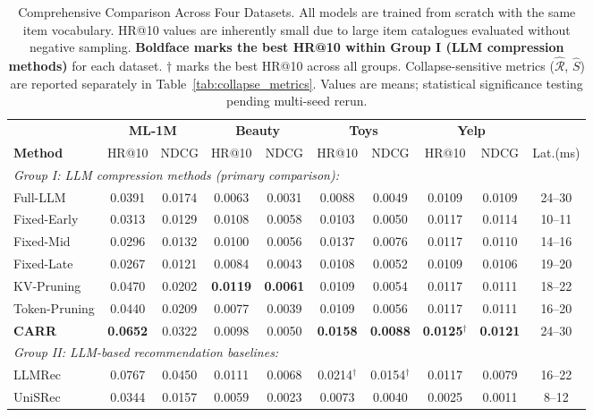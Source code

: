 \documentclass[lettersize,journal]{IEEEtran}
\begin{document}
\begin{table}[!t]
\caption{Comprehensive Comparison Across Four Datasets. All models are trained from scratch with the same item vocabulary. HR@10 values are inherently small due to large item catalogues evaluated without negative sampling. \textbf{Boldface marks the best HR@10 within Group I (LLM compression methods)} for each dataset. $\dagger$ marks the best HR@10 across all groups. Collapse-sensitive metrics ($\widehat{\mathcal{R}}$, $\widehat{S}$) are reported separately in Table~\ref{tab:collapse_metrics}. Values are means; statistical significance testing pending multi-seed rerun.\label{tab:main}}
\centering
\begin{tabular}{l|cc|cc|cc|cc|c}
\toprule
& \multicolumn{2}{c|}{\textbf{ML-1M}} & \multicolumn{2}{c|}{\textbf{Beauty}} & \multicolumn{2}{c|}{\textbf{Toys}} & \multicolumn{2}{c|}{\textbf{Yelp}} & \\
\textbf{Method} & HR@10 & NDCG & HR@10 & NDCG & HR@10 & NDCG & HR@10 & NDCG & Lat.(ms) \\
\midrule
\multicolumn{10}{l}{\textit{Group I: LLM compression methods (primary comparison):}} \\
\midrule
Full-LLM & 0.0391 & 0.0174 & 0.0063 & 0.0031 & 0.0088 & 0.0049 & 0.0109 & 0.0109 & 24--30 \\
Fixed-Early & 0.0313 & 0.0129 & 0.0108 & 0.0058 & 0.0103 & 0.0050 & 0.0117 & 0.0114 & 10--11 \\
Fixed-Mid & 0.0296 & 0.0132 & 0.0100 & 0.0056 & 0.0137 & 0.0076 & 0.0117 & 0.0110 & 14--16 \\
Fixed-Late & 0.0267 & 0.0121 & 0.0084 & 0.0043 & 0.0108 & 0.0052 & 0.0109 & 0.0106 & 19--20 \\
KV-Pruning & 0.0470 & 0.0202 & \textbf{0.0119} & \textbf{0.0061} & 0.0109 & 0.0054 & 0.0117 & 0.0111 & 18--22 \\
Token-Pruning & 0.0440 & 0.0209 & 0.0077 & 0.0039 & 0.0109 & 0.0056 & 0.0117 & 0.0111 & 16--20 \\
\textbf{CARR} & \textbf{0.0652} & 0.0322 & 0.0098 & 0.0050 & \textbf{0.0158} & \textbf{0.0088} & \textbf{0.0125}$^\dagger$ & \textbf{0.0121} & 24--30 \\
\midrule
\multicolumn{10}{l}{\textit{Group II: LLM-based recommendation baselines:}} \\
\midrule
LLMRec & 0.0767 & 0.0450 & 0.0111 & 0.0068 & 0.0214$^\dagger$ & 0.0154$^\dagger$ & 0.0117 & 0.0079 & 16--22 \\
UniSRec & 0.0344 & 0.0157 & 0.0059 & 0.0023 & 0.0073 & 0.0040 & 0.0025 & 0.0011 & 8--12 \\

\end{tabular}
\end{table}
\end{document}

